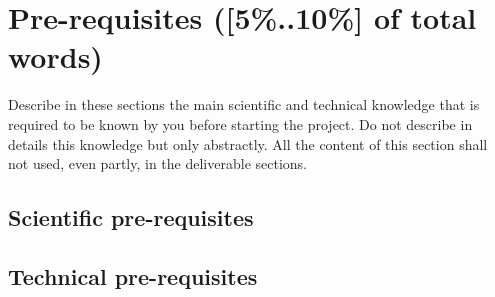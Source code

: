 {\color{gray}
\section{Pre-requisites ([5\%..10\%] of total words)} 
Describe in these sections the main scientific and technical knowledge that is required to be known by you before starting the project.
Do not describe in details this knowledge but only abstractly. All the content of this section shall not used, even partly, in the deliverable sections.

\subsection{Scientific pre-requisites}
\subsection{Technical pre-requisites}
}
